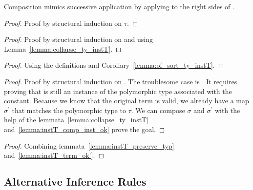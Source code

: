 Composition mimics successive application by applying  to the right sides of .

\begin{lemma}
\end{lemma}
\begin{proof}
    Proof by structural induction on \(\tau\).
\end{proof}

\begin{lemma}
\end{lemma}
\begin{proof}
    Proof by structural induction on  and using Lemma~\ref{lemma:collapse_ty_instT}.
\end{proof}

\begin{lemma}
\end{lemma}
\begin{proof}
    Using the definitions and Corollary~\ref{lemma:of_sort_ty_instT}.
\end{proof}

\begin{theorem}
\end{theorem}
\begin{proof}
    Proof by structural induction on .
    The troublesome case is .
    It requires proving that  is still an instance of the polymorphic type associated with the constant.
    Because we know that the original term is valid, we already have a map \(\sigma^\prime\) that matches the polymorphic type to \(\tau\).
    We can compose \(\sigma\) and \(\sigma^\prime\) with the help of the lemmata~\ref{lemma:collapse_ty_instT} and~\ref{lemma:instT_comp_inst_ok} prove the goal.
\end{proof}


\begin{corollary}
\end{corollary}
\begin{proof}
    Combining lemmata~\ref{lemma:instT_preserve_typ} and~\ref{lemma:instT_term_ok'}.
\end{proof}

\subsection{Alternative Inference Rules}

